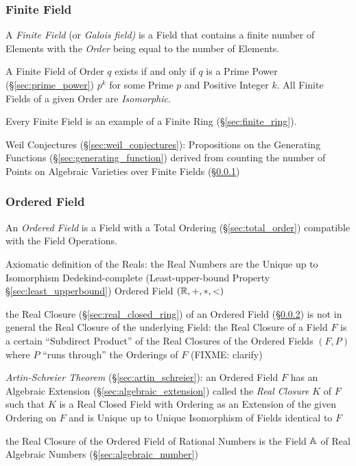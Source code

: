 \begin{itemize}
\subsubsection{Finite Field}\label{sec:finite_field}

A \emph{Finite Field} (or \emph{Galois field)} is a Field that contains a
finite number of Elements with the \emph{Order} being equal to the number of
Elements.

A Finite Field of Order $q$ exists if and only if $q$ is a Prime Power
(\S\ref{sec:prime_power}) $p^k$ for some Prime $p$ and Positive Integer $k$.
All Finite Fields of a given Order are \emph{Isomorphic}.

Every Finite Field is an example of a Finite Ring (\S\ref{sec:finite_ring}).

Weil Conjectures (\S\ref{sec:weil_conjectures}): Propositions on the Generating
Functions (\S\ref{sec:generating_function}) derived from counting the number of
Points on Algebraic Varieties over Finite Fields (\S\ref{sec:finite_field})



\subsubsection{Ordered Field}\label{sec:ordered_field}

An \emph{Ordered Field} is a Field with a Total Ordering
(\S\ref{sec:total_order}) compatible with the Field Operations.

Axiomatic definition of the Reals: the Real Numbers are the Unique up to
Isomorphism Dedekind-complete (Least-upper-bound Property
\S\ref{sec:least_upperbound}) Ordered Field $(\mathbb{R}, +, *, <)$

the Real Closure (\S\ref{sec:real_closed_ring}) of an Ordered Field
(\S\ref{sec:ordered_field}) is not in general the Real Closure of the
underlying Field: the Real Closure of a Field $F$ is a certain ``Subdirect
Product'' of the Real Closures of the Ordered Fields $(F,P)$ where $P$ ``runs
through'' the Orderings of $F$ (FIXME: clarify)

\emph{Artin-Schreier Theorem} (\S\ref{sec:artin_schreier}): an Ordered Field
$F$ has an Algebraic Extension (\S\ref{sec:algebraic_extension}) called the
\emph{Real Closure} $K$ of $F$ such that $K$ is a Real Closed Field with
Ordering as an Extension of the given Ordering on $F$ and is Unique up to
Unique Isomorphism of Fields identical to $F$

the Real Closure of the Ordered Field of Rational Numbers is the Field $\mathbb{A}$
of Real Algebraic Numbers (\S\ref{sec:algebraic_number})




\end{itemize}
